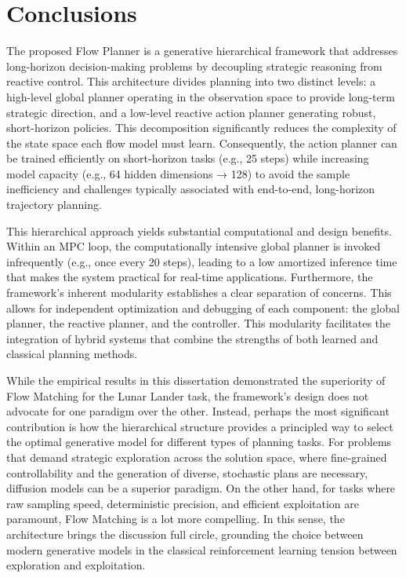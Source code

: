  \chapter{Conclusions}
The proposed Flow Planner is a generative hierarchical framework that addresses long-horizon decision-making problems by decoupling strategic reasoning from reactive control. This architecture divides planning into two distinct levels: a high-level global planner operating in the observation space to provide long-term strategic direction, and a low-level reactive action planner generating robust, short-horizon policies. This decomposition significantly reduces the complexity of the state space each flow model must learn. Consequently, the action planner can be trained efficiently on short-horizon tasks (e.g., 25 steps) while increasing model capacity (e.g., 64 hidden dimensions → 128) to avoid the sample inefficiency and challenges typically associated with end-to-end, long-horizon trajectory planning.

This hierarchical approach yields substantial computational and design benefits. Within an MPC loop, the computationally intensive global planner is invoked infrequently (e.g., once every 20 steps), leading to a low amortized inference time that makes the system practical for real-time applications. Furthermore, the framework's inherent modularity establishes a clear separation of concerns. This allows for independent optimization and debugging of each component: the global planner, the reactive planner, and the controller. This modularity facilitates the integration of hybrid systems that combine the strengths of both learned and classical planning methods.

While the empirical results in this dissertation demonstrated the superiority of Flow Matching for the Lunar Lander task, the framework's design does not advocate for one paradigm over the other. Instead, perhaps the most significant contribution is how the hierarchical structure provides a principled way to select the optimal generative model for different types of planning tasks. For problems that demand strategic exploration across the solution space, where fine-grained controllability and the generation of diverse, stochastic plans are necessary, diffusion models can be a superior paradigm. On the other hand, for tasks where raw sampling speed, deterministic precision, and efficient exploitation are paramount, Flow Matching is a lot more compelling. In this sense, the architecture brings the discussion full circle, grounding the choice between modern generative models in the classical reinforcement learning tension between exploration and exploitation.

